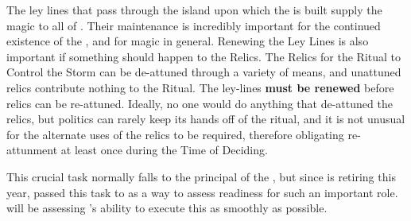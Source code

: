 \documentclass[green]{GL2020}
\begin{document}
\name{\gLeyLines{}}

The ley lines that pass through the island upon which the \pSchool{} is built supply the magic to all of \pEarth{}. Their maintenance is incredibly important for the continued existence of the \pSc{}, and for magic in general. Renewing the Ley Lines is also important if something should happen to the Relics. The Relics for the Ritual to Control the Storm can be de-attuned through a variety of means, and unattuned relics contribute nothing to the Ritual. The ley-lines \textbf{must be renewed} before relics can be re-attuned. Ideally, no one would do anything that de-attuned the relics, but politics can rarely keep its hands off of the ritual, and it is not unusual for the alternate uses of the relics to be required, therefore obligating re-attunment at least once during the Time of Deciding.

This crucial task normally falls to the principal of the \pSc{}, but since \cPrincipal{\full} is retiring this year, \cPrincipal{\they} \cPrincipal{\have} passed this task to \cBeetle{} as a way to assess \cBeetle{\their} readiness for such an important role. \cPrincipal{} will be assessing \cBeetle{}’s ability to execute this as smoothly as possible.
\end{document}
